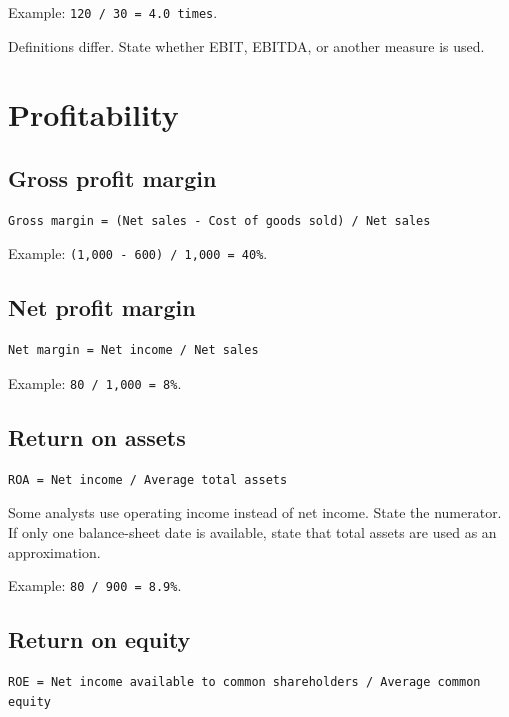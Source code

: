 \documentclass[11pt,letterpaper,oneside,openany]{book}
\begin{document}
Example: \texttt{120 / 30 = 4.0 times}.


Definitions differ. State whether EBIT, EBITDA, or another measure is used.


\section[Profitability]{Profitability}
\subsection[Gross profit margin]{Gross profit margin}
\begin{Verbatim}[fontsize=\small,breaklines=true,breakanywhere=true,frame=single,framesep=2mm]
Gross margin = (Net sales - Cost of goods sold) / Net sales
\end{Verbatim}

Example: \texttt{(1,000 - 600) / 1,000 = 40\%}.


\subsection[Net profit margin]{Net profit margin}
\begin{Verbatim}[fontsize=\small,breaklines=true,breakanywhere=true,frame=single,framesep=2mm]
Net margin = Net income / Net sales
\end{Verbatim}

Example: \texttt{80 / 1,000 = 8\%}.


\subsection[Return on assets]{Return on assets}
\begin{Verbatim}[fontsize=\small,breaklines=true,breakanywhere=true,frame=single,framesep=2mm]
ROA = Net income / Average total assets
\end{Verbatim}

Some analysts use operating income instead of net income. State the numerator. If only one balance-sheet date is available, state that total assets are used as an approximation.


Example: \texttt{80 / 900 = 8.9\%}.


\subsection[Return on equity]{Return on equity}
\begin{Verbatim}[fontsize=\small,breaklines=true,breakanywhere=true,frame=single,framesep=2mm]
ROE = Net income available to common shareholders / Average common equity
\end{Verbatim}
\end{document}
